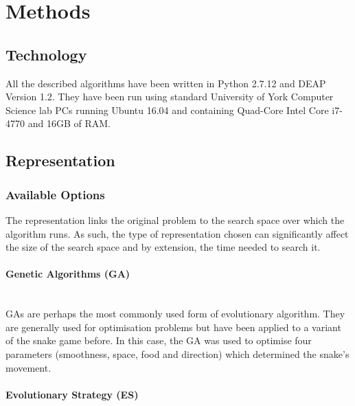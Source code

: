 \documentclass{article}
\newcommand{\myparagraph}[1]{\paragraph{#1}\mbox{}\\}
\begin{document}
\section{Methods} %
\subsection{Technology}
All the described algorithms have been written in Python 2.7.12 and DEAP Version 1.2. They have been run using standard University of York Computer Science lab PCs running Ubuntu 16.04 and containing Quad-Core Intel Core i7-4770 and 16GB of RAM.

\subsection{Representation}
\subsubsection{Available Options}
The representation links the original problem to the search space over which the algorithm runs. As such, the type of representation chosen can significantly affect the size of the search space and by extension, the time needed to search it.


\myparagraph{Genetic Algorithms (GA)}
GAs are perhaps the most commonly used form of evolutionary algorithm. They are generally used for optimisation problems but have been applied to a variant of the snake game before\cite{snake_paper}. In this case, the GA was used to optimise four parameters (smoothness, space, food and direction) which determined the snake's movement.

\myparagraph{Evolutionary Strategy (ES)}
\end{document}
